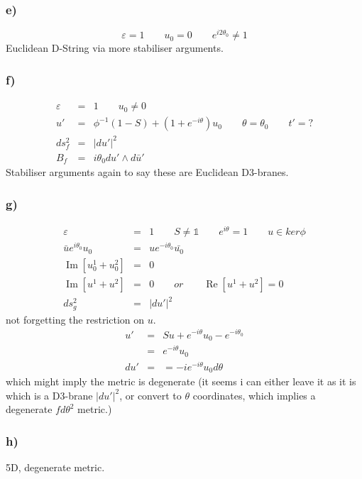 \documentclass[11pt, a4paper]{article}
\DeclareMathOperator{\im}{Im}
\DeclareMathOperator{\re}{Re}
\newcommand{\1}{\mathbb{1}}
\begin{document}
\subsubsection{e)}
\begin{equation}
  \label{eq:e}
  \varepsilon=1\qquad u_0=0\qquad e^{i2\theta_0}\neq 1
\end{equation}
Euclidean D-String via more stabiliser arguments.

\subsubsection{f)}
\begin{eqnarray}
  \label{eq:f}
  \varepsilon&=&1\qquad u_0\neq 0\\\nonumber
  u'&=&\phi^{-1}(1-S)+(1+e^{-i\theta})u_0\qquad \theta=\theta_0\qquad t'=?
  \\\nonumber
  ds^2_f&=&|du'|^2\\\nonumber
  B_f&=&i\theta_0 du'\wedge d\bar u'
\end{eqnarray}
Stabiliser arguments again to say these are Euclidean D3-branes.

\subsubsection{g)}
\begin{eqnarray}
  \label{eq:g}
  \varepsilon&=&1\qquad S\neq\1\qquad e^{i\theta}=1\qquad u\in ker
  \phi\\\nonumber
  \bar u e^{i\theta_0}u_0&=&ue^{-i\theta_0}\bar{u_0}\\\nonumber
  \im[u_0^1+u_0^2]&=&0\\\nonumber
  \im[u^1+u^2]&=&0 \qquad or\qquad \re[u^1+u^2]=0
  \\\nonumber
  ds^2_g&=&|du'|^2
\end{eqnarray}
not forgetting the restriction on $u$.
\begin{eqnarray*}
  \label{eq:g:u}
  u'&=&Su+e^{-i\theta}u_0-e^{-i\theta_0}\\
  &=&e^{-i\theta}u_0\\
  du'&=&=-ie^{-i\theta}u_0d\theta
\end{eqnarray*}
which might imply the metric is degenerate (it seems i can either leave it as it
is which is a D3-brane $|du'|^2$, or convert to $\theta$ coordinates, which
implies a degenerate $fd\theta^2$ metric.)

\subsubsection{h)}
5D, degenerate metric.
\end{document}
